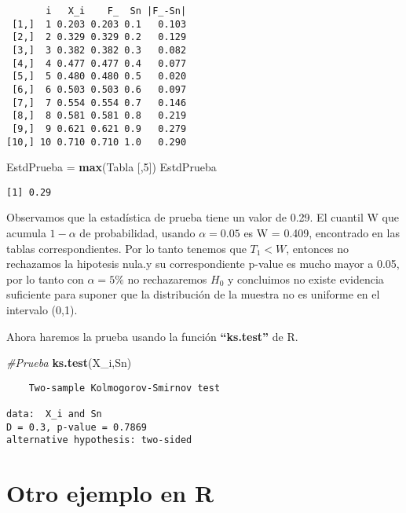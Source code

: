 \documentclass[
  a4paper,
  oneside,
  openany]{book}
\newenvironment{Shaded}{\begin{snugshade}}{\end{snugshade}}
\newcommand{\CommentTok}[1]{\textcolor[rgb]{0.56,0.35,0.01}{\textit{#1}}}
\newcommand{\DecValTok}[1]{\textcolor[rgb]{0.00,0.00,0.81}{#1}}
\newcommand{\KeywordTok}[1]{\textcolor[rgb]{0.13,0.29,0.53}{\textbf{#1}}}
\newcommand{\NormalTok}[1]{#1}
\newcommand{\StringTok}[1]{\textcolor[rgb]{0.31,0.60,0.02}{#1}}
\begin{document}
\begin{verbatim}
       i   X_i    F_  Sn |F_-Sn|
 [1,]  1 0.203 0.203 0.1   0.103
 [2,]  2 0.329 0.329 0.2   0.129
 [3,]  3 0.382 0.382 0.3   0.082
 [4,]  4 0.477 0.477 0.4   0.077
 [5,]  5 0.480 0.480 0.5   0.020
 [6,]  6 0.503 0.503 0.6   0.097
 [7,]  7 0.554 0.554 0.7   0.146
 [8,]  8 0.581 0.581 0.8   0.219
 [9,]  9 0.621 0.621 0.9   0.279
[10,] 10 0.710 0.710 1.0   0.290
\end{verbatim}

\begin{Shaded}
\begin{Highlighting}[]
\NormalTok{EstdPrueba =}\StringTok{ }\KeywordTok{max}\NormalTok{(Tabla [,}\DecValTok{5}\NormalTok{])}
\NormalTok{EstdPrueba}
\end{Highlighting}
\end{Shaded}

\begin{verbatim}
[1] 0.29
\end{verbatim}

Observamos que la estadística de prueba tiene un valor de 0.29. El cuantil W que acumula \(1-\alpha\) de probabilidad, usando \(\alpha=0.05\) es W = 0.409, encontrado en las tablas correspondientes. Por lo tanto tenemos que \(T_1 < W\), entonces no rechazamos la hipotesis nula.y su correspondiente p-value es mucho mayor a 0.05, por lo tanto con \(\alpha=5\%\) no rechazaremos \(H_0\) y concluimos no existe evidencia suficiente para suponer que la distribución de la muestra no es uniforme en el intervalo (0,1).

Ahora haremos la prueba usando la función \textbf{``ks.test''} de R.

\begin{Shaded}
\begin{Highlighting}[]
\CommentTok{\#Prueba}
\KeywordTok{ks.test}\NormalTok{(X\_i,Sn)}
\end{Highlighting}
\end{Shaded}

\begin{verbatim}
    Two-sample Kolmogorov-Smirnov test

data:  X_i and Sn
D = 0.3, p-value = 0.7869
alternative hypothesis: two-sided
\end{verbatim}

\hypertarget{otro-ejemplo-en-r}{%
\section{Otro ejemplo en R}\label{otro-ejemplo-en-r}}
\end{document}
